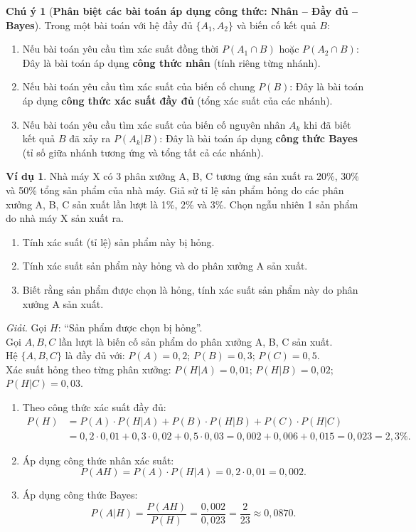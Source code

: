 \documentclass[12pt,a4paper]{article}
\theoremstyle{definition}
\newtheorem{vidu}{Ví dụ}[section]
\newtheorem{chuy}{Chú ý}[section]
\begin{document}
\begin{chuy}[\textbf{Phân biệt các bài toán áp dụng công thức: Nhân -- Đầy đủ -- Bayes}]
Trong một bài toán với hệ đầy đủ $\{A_1, A_2\}$ và biến cố kết quả $B$:
\begin{enumerate}[label=\arabic*)]
    \item Nếu bài toán yêu cầu tìm xác suất đồng thời $P(A_1 \cap B)$ hoặc $P(A_2 \cap B)$: Đây là bài toán áp dụng \textbf{công thức nhân} (tính riêng từng nhánh).
    \item Nếu bài toán yêu cầu tìm xác suất của biến cố chung $P(B)$: Đây là bài toán áp dụng \textbf{công thức xác suất đầy đủ} (tổng xác suất của các nhánh).
    \item Nếu bài toán yêu cầu tìm xác suất của biến cố nguyên nhân $A_k$ khi đã biết kết quả $B$ đã xảy ra $P(A_k|B)$: Đây là bài toán áp dụng \textbf{công thức Bayes} (tỉ số giữa nhánh tương ứng và tổng tất cả các nhánh).
\end{enumerate}
\end{chuy}

\begin{vidu}
Nhà máy X có 3 phân xưởng A, B, C tương ứng sản xuất ra 20\%, 30\% và 50\% tổng sản phẩm của nhà máy. Giả sử tỉ lệ sản phẩm hỏng do các phân xưởng A, B, C sản xuất lần lượt là 1\%, 2\% và 3\%. Chọn ngẫu nhiên 1 sản phẩm do nhà máy X sản xuất ra.
\begin{enumerate}[label=\arabic*)]
    \item Tính xác suất (tỉ lệ) sản phẩm này bị hỏng.
    \item Tính xác suất sản phẩm này hỏng và do phân xưởng A sản xuất.
    \item Biết rằng sản phẩm được chọn là hỏng, tính xác suất sản phẩm này do phân xưởng A sản xuất.
\end{enumerate}
\textit{Giải.} Gọi $H$: ``Sản phẩm được chọn bị hỏng''.\\
Gọi $A, B, C$ lần lượt là biến cố sản phẩm do phân xưởng A, B, C sản xuất.\\
Hệ $\{A, B, C\}$ là đầy đủ với: $P(A) = 0{,}2$; $P(B) = 0{,}3$; $P(C) = 0{,}5$.\\
Xác suất hỏng theo từng phân xưởng: $P(H|A) = 0{,}01$; $P(H|B) = 0{,}02$; $P(H|C) = 0{,}03$.
\begin{enumerate}[label=\arabic*)]
    \item Theo công thức xác suất đầy đủ:
    \begin{align*}
    P(H) &= P(A) \cdot P(H|A) + P(B) \cdot P(H|B) + P(C) \cdot P(H|C) \\
         &= 0{,}2 \cdot 0{,}01 + 0{,}3 \cdot 0{,}02 + 0{,}5 \cdot 0{,}03 = 0{,}002 + 0{,}006 + 0{,}015 = 0{,}023 = 2{,}3\%.
    \end{align*}
    \item Áp dụng công thức nhân xác suất:
    \[
    P(AH) = P(A) \cdot P(H|A) = 0{,}2 \cdot 0{,}01 = 0{,}002.
    \]
    \item Áp dụng công thức Bayes:
    \[
    P(A|H) = \frac{P(AH)}{P(H)} = \frac{0{,}002}{0{,}023} = \frac{2}{23} \approx 0{,}0870.
    \]
\end{enumerate}
\end{vidu}
\end{document}

